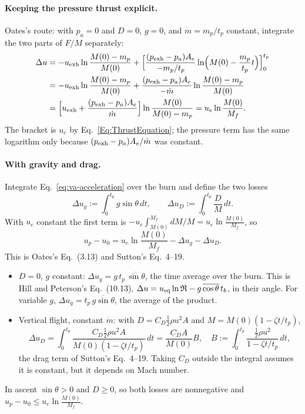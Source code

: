 \paragraph{Keeping the pressure thrust explicit.} Oates's route: with
$p_a=0$ and $D=0$, $g=0$, and $\dot m=m_p/t_p$ constant, integrate the two
parts of $F/M$ separately:
\[
\begin{aligned}
 \Delta u
 &=-u_{\rm exh}\ln\frac{M(0)-m_p}{M(0)}
  +\Bigl[\frac{(p_{\rm exh}-p_a)A_e}{-m_p/t_p}
   \ln\Bigl(M(0)-\frac{m_p}{t_p}t\Bigr)\Bigr]_0^{t_p}\\
 &=-u_{\rm exh}\ln\frac{M(0)-m_p}{M(0)}
  +\frac{(p_{\rm exh}-p_a)A_e}{-\dot m}\ln\frac{M(0)-m_p}{M(0)}\\
 &=\Bigl[u_{\rm exh}+\frac{(p_{\rm exh}-p_a)A_e}{\dot m}\Bigr]
   \ln\frac{M(0)}{M(0)-m_p}
 =u_e\ln\frac{M(0)}{M_f} .
\end{aligned}
\]
The bracket is $u_e$ by Eq.~\ref{Eq:ThrustEquation}; the pressure term has
the same logarithm only because $(p_{\rm exh}-p_a)A_e/\dot m$ was constant.

\paragraph{With gravity and drag.} Integrate Eq.~\ref{eq:va-acceleration}
over the burn and define the two losses
\begin{equation}\label{eq:va-losses}
 \Delta u_g:=\int_0^{t_p}g\sin\theta\,dt,\qquad
 \Delta u_D:=\int_0^{t_p}\frac{D}{M}\,dt .
\end{equation}
With $u_e$ constant the first term is
$-u_e\int_{M(0)}^{M_f}dM/M=u_e\ln\frac{M(0)}{M_f}$, so
\begin{equation}\label{eq:va-budget}
 u_p-u_0=u_e\ln\frac{M(0)}{M_f}-\Delta u_g-\Delta u_D .
\end{equation}
This is Oates's Eq.~(3.13) and Sutton's Eq.~4--19.
\begin{itemize}\itemsep1pt
\item $D=0$, $g$ constant: $\Delta u_g=g\,t_p\,\overline{\sin\theta}$, the
  time average over the burn. This is Hill and Peterson's Eq.~(10.13),
  $\Delta u=u_{\rm eq}\ln\mathfrak R-g\,\overline{\cos\theta}\,t_b$, in their
  angle. For variable $g$, $\Delta u_g=t_p\,\overline{g\sin\theta}$, the
  average of the product.
\item Vertical flight, constant $\dot m$: with
  $D=C_D\tfrac12\rho u^2A$ and $M=M(0)(1-\zeta t/t_p)$,
  \[
   \Delta u_D=\int_0^{t_p}
   \frac{C_D\tfrac12\rho u^2A}{M(0)(1-\zeta t/t_p)}\,dt
   =\frac{C_DA}{M(0)}B,
   \quad
   B:=\int_0^{t_p}\frac{\tfrac12\rho u^2}{1-\zeta t/t_p}\,dt ,
  \]
  the drag term of Sutton's Eq.~4--19. Taking $C_D$ outside the integral
  assumes it is constant, but it depends on Mach number.
\end{itemize}
In ascent $\sin\theta>0$ and $D\ge0$, so both losses are nonnegative and
$u_p-u_0\le u_e\ln\frac{M(0)}{M_f}$.


